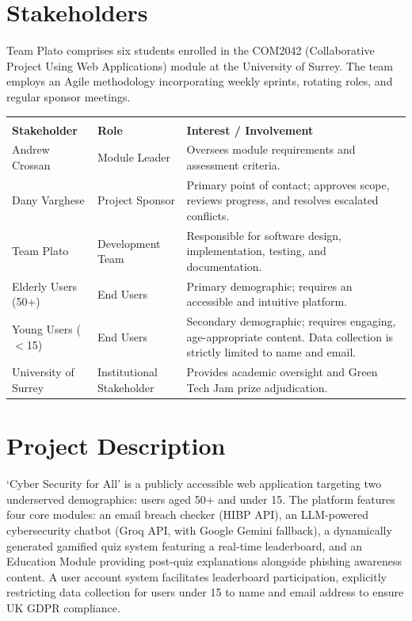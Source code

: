 \documentclass[11pt, a4paper]{report}
\begin{document}
\section{Stakeholders}
Team Plato comprises six students enrolled in the COM2042 (Collaborative Project Using Web Applications) module at the University of Surrey. The team employs an Agile methodology incorporating weekly sprints, rotating roles, and regular sponsor meetings. 

\begin{table}[!htpb]
    \setlength{\extrarowheight}{2pt}
    \begin{tabularx}{\textwidth}{llX}
        \toprule
        \\[-1.5\normalbaselineskip]
        \textbf{Stakeholder} & \textbf{Role} & \textbf{Interest / Involvement} \\ [0em]
        \midrule
        Andrew Crossan & Module Leader & Oversees module requirements and assessment criteria. \\
        Dany Varghese & Project Sponsor & Primary point of contact; approves scope, reviews progress, and resolves escalated conflicts. \\
        Team Plato & Development Team & Responsible for software design, implementation, testing, and documentation. \\
        Elderly Users (50+) & End Users & Primary demographic; requires an accessible and intuitive platform. \\
        Young Users ($<$15) & End Users & Secondary demographic; requires engaging, age-appropriate content. Data collection is strictly limited to name and email. \\
        University of Surrey & Institutional Stakeholder & Provides academic oversight and Green Tech Jam prize adjudication. \\
        \bottomrule
    \end{tabularx}
\end{table}

\section{Project Description}
`Cyber Security for All' is a publicly accessible web application targeting two underserved demographics: users aged 50+ and under 15. The platform features four core modules: an email breach checker (HIBP API), an LLM-powered cybersecurity chatbot (Groq API, with Google Gemini fallback), a dynamically generated gamified quiz system featuring a real-time leaderboard, and an Education Module providing post-quiz explanations alongside phishing awareness content. A user account system facilitates leaderboard participation, explicitly restricting data collection for users under 15 to name and email address to ensure UK GDPR compliance.
\end{document}
